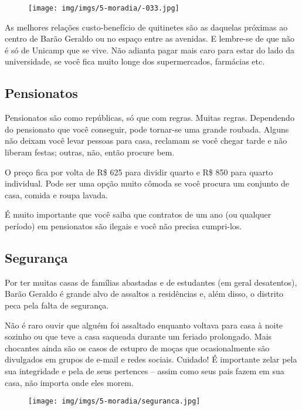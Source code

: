 \begin{figure}[h!]
    \centering
    \texttt{[image: img/imgs/5-moradia/-033.jpg]}
\end{figure}

As melhores relações custo-benefício de quitinetes são as daquelas próximas ao
centro de Barão Geraldo ou no espaço entre as avenidas. E lembre-se de que não é
só de Unicamp que se vive. Não adianta pagar mais caro para estar do lado da
universidade, se você fica muito longe dos supermercados, farmácias etc.

\subsection{Pensionatos}

Pensionatos são como repúblicas, só que com regras. Muitas regras. Dependendo
do pensionato que você conseguir, pode tornar-se uma grande roubada. Alguns não
deixam você levar pessoas para casa, reclamam se você chegar tarde e não liberam
festas; outras, não, então procure bem.

O preço fica por volta de R\$ 625 para dividir quarto e R\$ 850 para quarto
individual. Pode ser uma opção muito cômoda se você procura um conjunto de casa,
comida e roupa lavada.

É muito importante que você saiba que contratos de um ano (ou qualquer período)
em pensionatos são ilegais e você não precisa cumpri-los.

\subsection{Segurança}

Por ter muitas casas de famílias abastadas e de estudantes (em geral desatentos),
Barão Geraldo é grande alvo de assaltos a residências e, além disso, o distrito
peca pela falta de segurança.

Não é raro ouvir que alguém foi assaltado enquanto voltava para casa à noite
sozinho ou que teve a casa saqueada durante um feriado prolongado. Mais chocantes
ainda são os casos de estupro de moças que ocasionalmente são divulgados em
grupos de e-mail e redes sociais. Cuidado! É importante zelar pela sua
integridade e pela de seus pertences -- assim como seus pais fazem em sua casa,
não importa onde eles morem.

\begin{figure}[h!]
    \centering
    \texttt{[image: img/imgs/5-moradia/seguranca.jpg]}
\end{figure}

